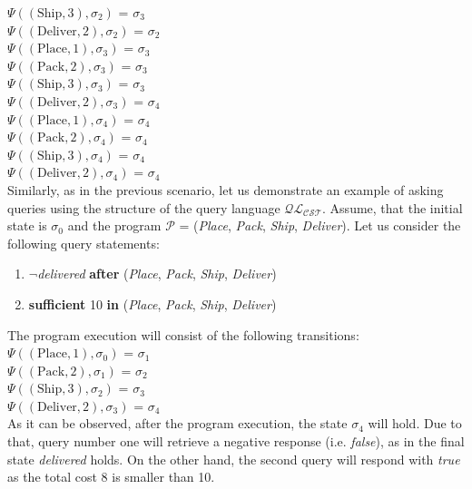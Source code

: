 \documentclass[a4paper]{article}
\begin{document}
$\Psi((\text{Ship},3),\sigma_2)$ = $\sigma_3$ \\[0.1\baselineskip] 
$\Psi((\text{Deliver},2),\sigma_2)$ = $\sigma_2$ \\[0.7\baselineskip] 
$\Psi((\text{Place},1),\sigma_3)$ = $\sigma_3$ \\[0.1\baselineskip] 
$\Psi((\text{Pack},2),\sigma_3)$ = $\sigma_3$ \\[0.1\baselineskip] 
$\Psi((\text{Ship},3),\sigma_3)$ = $\sigma_3$ \\[0.1\baselineskip] 
$\Psi((\text{Deliver},2),\sigma_3)$ = $\sigma_4$ \\[0.7\baselineskip] 
$\Psi((\text{Place},1),\sigma_4)$ = $\sigma_4$ \\[0.1\baselineskip] 
$\Psi((\text{Pack},2),\sigma_4)$ = $\sigma_4$ \\[0.1\baselineskip] 
$\Psi((\text{Ship},3),\sigma_4)$ = $\sigma_4$ \\[0.1\baselineskip] 
$\Psi((\text{Deliver},2),\sigma_4)$ = $\sigma_4$ \\[0.7\baselineskip] 
Similarly, as in the previous scenario, let us demonstrate an example of asking queries using the structure of the query language $\mathcal{QL_{CST}}$. Assume, that the initial state is $\sigma_0$ and the program $\mathcal{P}$ = (\textit{Place}, \textit{Pack}, \textit{Ship}, \textit{Deliver}). Let us consider the following query statements:
\begin{enumerate}
    \item $\neg$\textit{delivered} \textbf{after} (\textit{Place}, \textit{Pack}, \textit{Ship}, \textit{Deliver})
    \item \textbf{sufficient} 10 \textbf{in} (\textit{Place}, \textit{Pack}, \textit{Ship}, \textit{Deliver})
\end{enumerate}
The program execution will consist of the following transitions: \\[0.5\baselineskip]
$\Psi((\text{Place},1),\sigma_0)$ = $\sigma_1$ \\[0.1\baselineskip]
$\Psi((\text{Pack},2),\sigma_1)$ = $\sigma_2$ \\[0.1\baselineskip]
$\Psi((\text{Ship},3),\sigma_2)$ = $\sigma_3$ \\[0.1\baselineskip]
$\Psi((\text{Deliver},2),\sigma_3)$ = $\sigma_4$ \\[0.7\baselineskip]
As it can be observed, after the program execution, the state $\sigma_4$ will hold. Due to that, query number one will retrieve a negative response (i.e. \textit{false}), as in the final state \textit{delivered} holds. On the other hand, the second query will respond with \textit{true} as the total cost 8 is smaller than 10.
\end{document}
